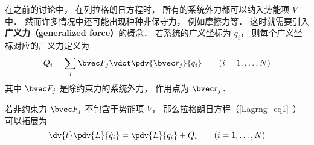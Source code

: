 
\begin{issues}
\issueDraft
\end{issues}


在之前的讨论中， 在列拉格朗日方程时， 所有的系统外力都可以纳入势能项 $V$ 中． 然而许多情况中还可能出现种种非保守力， 例如摩擦力等． 这时就需要引入\textbf{广义力（generalized force）}的概念． 若系统的广义坐标为 $q_i$， 则每个广义坐标对应的广义力定义为
\begin{equation}
Q_i = \sum_j \bvec F_j \vdot \pdv{\bvec r_j}{q_i} \qquad (i=1,\dots,N)
\end{equation}
其中 $\bvec F_j$ 是除约束力的系统外力， 作用点为 $\bvec r_j$．

若非约束力 $\bvec F_j$ 不包含于势能项 $V$， 那么拉格朗日方程（\autoref{Lagrng_eq1}~）可以拓展为
\begin{equation}\label{LagEqQ_eq1}
\dv{t} \pdv{L}{\dot q_i} = \pdv{L}{q_i} + Q_i
\qquad (i=1,\dots,N)
\end{equation}

